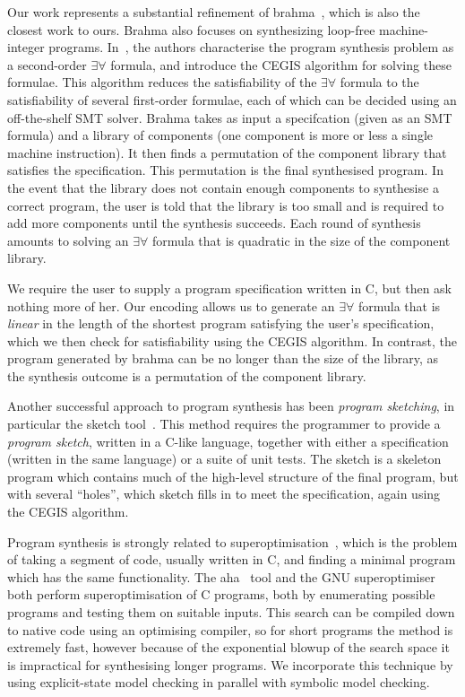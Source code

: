 \documentclass[a4paper]{llncs}
\begin{document}
Our work represents a substantial refinement of {\sc brahma}~\cite{brahma},
which is also the closest work to ours.  {\sc Brahma} also focuses on
synthesizing loop-free machine-integer programs.  In~\cite{brahma}, the
authors characterise the program synthesis problem as a second-order
$\exists \forall$ formula, and introduce the CEGIS algorithm for solving
these formulae.  This algorithm reduces the satisfiability of the $\exists
\forall$ formula to the satisfiability of several first-order formulae, each
of which can be decided using an off-the-shelf SMT solver.  {\sc Brahma}
takes as input a specifcation (given as an SMT formula) and a library of
components (one component is more or less a single machine instruction).  It
then finds a permutation of the component library that satisfies the
specification.  This permutation is the final synthesised program.  In the
event that the library does not contain enough components to synthesise a
correct program, the user is told that the library is too small and is
required to add more components until the synthesis succeeds.  Each round of
synthesis amounts to solving an $\exists \forall$ formula that is quadratic
in the size of the component library.

We require the user to supply a program specification written in C, but then
ask nothing more of her.  Our encoding allows us to generate an $\exists
\forall$ formula that is \emph{linear} in the length of the shortest program
satisfying the user's specification, which we then check for satisfiability
using the CEGIS algorithm.  In contrast, the program generated by {\sc
brahma} can be no longer than the size of the library, as the synthesis
outcome is a permutation of the component library.

Another successful approach to program synthesis has been \emph{program
sketching}, in particular the {\sc sketch} tool~\cite{sketch}.  This method
requires the programmer to provide a \emph{program sketch}, written in a
C-like language, together with either a specification (written in the same
language) or a suite of unit tests.  The sketch is a skeleton program which
contains much of the high-level structure of the final program, but with
several ``holes'', which {\sc sketch} fills in to meet the specification,
again using the CEGIS algorithm.

Program synthesis is strongly related to superoptimisation~\cite{superoptimisation},
which is the problem of taking a segment of code, usually written in C, and finding
a minimal program which has the same functionality.  The {\sc aha}~\cite{aha} tool
and the GNU superoptimiser~\cite{gnu-superoptimiser} both perform superoptimisation of
C programs, both by enumerating possible programs and testing them on suitable inputs.
This search can be compiled down to native code using an optimising compiler,
so for short programs the method is extremely fast, however because of the exponential
blowup of the search space it is impractical for synthesising longer programs.
We incorporate this technique by using explicit-state model checking in parallel
with symbolic model checking.
\end{document}

